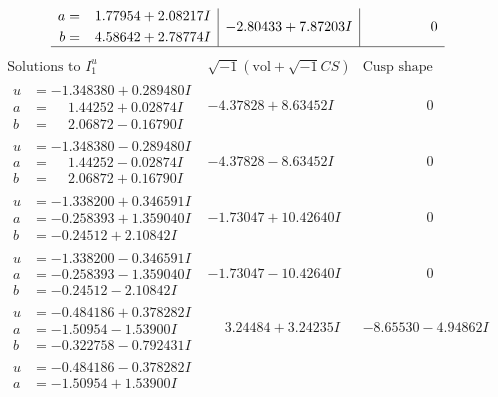 \documentclass[1p]{elsarticle_modified}
\theoremstyle{definition}
\newcommand{\I}{\sqrt{-1}}
\begin{document}
$$\begin{array}{c|c|c}
\begin{aligned}
a &= \phantom{-}1.77954 + 2.08217 I \\
b &= \phantom{-}4.58642 + 2.78774 I\end{aligned}
 & -2.80433 + 7.87203 I & \phantom{-0.000000 } 0\\
 \hline 
 \end{array}$$\newpage$$\begin{array}{c|c|c}  
\text{Solutions to }I^u_{1}& \I (\text{vol} + \sqrt{-1}CS) & \text{Cusp shape}\\
 \hline 
\begin{aligned}
u &= -1.348380 + 0.289480 I \\
a &= \phantom{-}1.44252 + 0.02874 I \\
b &= \phantom{-}2.06872 - 0.16790 I\end{aligned}
 & -4.37828 + 8.63452 I & \phantom{-0.000000 } 0 \\ \hline\begin{aligned}
u &= -1.348380 - 0.289480 I \\
a &= \phantom{-}1.44252 - 0.02874 I \\
b &= \phantom{-}2.06872 + 0.16790 I\end{aligned}
 & -4.37828 - 8.63452 I & \phantom{-0.000000 } 0 \\ \hline\begin{aligned}
u &= -1.338200 + 0.346591 I \\
a &= -0.258393 + 1.359040 I \\
b &= -0.24512 + 2.10842 I\end{aligned}
 & -1.73047 + 10.42640 I & \phantom{-0.000000 } 0 \\ \hline\begin{aligned}
u &= -1.338200 - 0.346591 I \\
a &= -0.258393 - 1.359040 I \\
b &= -0.24512 - 2.10842 I\end{aligned}
 & -1.73047 - 10.42640 I & \phantom{-0.000000 } 0 \\ \hline\begin{aligned}
u &= -0.484186 + 0.378282 I \\
a &= -1.50954 - 1.53900 I \\
b &= -0.322758 - 0.792431 I\end{aligned}
 & \phantom{-}3.24484 + 3.24235 I & -8.65530 - 4.94862 I \\ \hline\begin{aligned}
u &= -0.484186 - 0.378282 I \\
a &= -1.50954 + 1.53900 I \\

\end{aligned}
\end{array}$$
\end{document}

